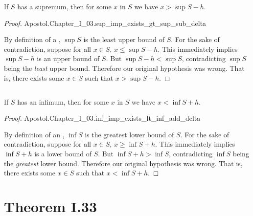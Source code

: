 \documentclass{report}
\begin{document}
\begin{theorem}[I.32a]

  If $S$ has a supremum, then for some $x$ in $S$ we have $x > \sup{S} - h$.

\end{theorem}

\begin{proof}

    {Apostol.Chapter\_I\_03.sup\_imp\_exists\_gt\_sup\_sub\_delta}

  By definition of a , $\sup{S}$ is the least upper
    bound of $S$.
  For the sake of contradiction, suppose for all $x \in S$,
    $x \leq \sup{S} - h$.
  This immediately implies $\sup{S} - h$ is an upper bound of $S$.
  But $\sup{S} - h < \sup{S}$, contradicting $\sup{S}$ being the \textit{least}
    upper bound.
  Therefore our original hypothesis was wrong.
  That is, there exists some $x \in S$ such that $x > \sup{S} - h$.

\end{proof}

\subsection{}%
\label{sub:theorem-i.32b}

\begin{theorem}[I.32b]

  If $S$ has an infimum, then for some $x$ in $S$ we have $x < \inf{S} + h$.

\end{theorem}

\begin{proof}

    {Apostol.Chapter\_I\_03.inf\_imp\_exists\_lt\_inf\_add\_delta}

  By definition of an , $\inf{S}$ is the greatest lower
    bound of $S$.
  For the sake of contradiction, suppose for all $x \in S$,
    $x \geq \inf{S} + h$.
  This immediately implies $\inf{S} + h$ is a lower bound of $S$.
  But $\inf{S} + h > \inf{S}$, contradicting $\inf{S}$ being the
    \textit{greatest} lower bound.
  Therefore our original hypothesis was wrong.
  That is, there exists some $x \in S$ such that $x < \inf{S} + h$.

\end{proof}

\section{Theorem I.33}%
\label{sec:theorem-i.33}
\end{document}
